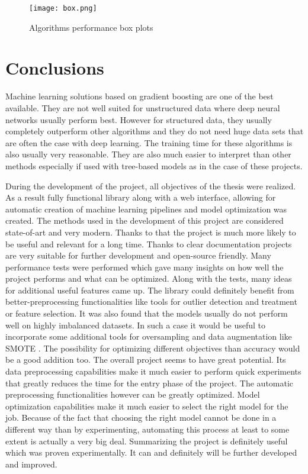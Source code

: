 \documentclass[a4paper,twoside,12pt]{book}
\begin{document}
\begin{figure}[!htb]
    \centering
    \texttt{[image: box.png]}
    \caption{Algorithms performance box plots}
    \label{fig:box}
\end{figure}

\chapter{Conclusions}
Machine learning solutions based on gradient boosting are one of the best available. They are not well suited for unstructured data where deep neural networks usually perform best. However for structured data, they usually completely outperform other algorithms and they do not need huge data sets that are often the case with deep learning. The training time for these algorithms is also usually very reasonable. They are also much easier to interpret than other methods especially if used with tree-based models as in the case of these projects.

During the development of the project, all objectives of the thesis were realized. 
As a result fully functional library along with a web interface, allowing for automatic creation of machine learning pipelines and model optimization was created.
The methods used in the development of this project are considered state-of-art and very modern. Thanks to that the project is much more likely to be useful and relevant for a long time.
Thanks to clear documentation projects are very suitable for further development and open-source friendly. Many performance tests were performed which gave many insights on how well the project performs and what can be optimized.
Along with the tests, many ideas for additional useful features came up. The library could definitely benefit from better-preprocessing functionalities like tools for outlier detection and treatment or feature selection.
It was also found that the models usually do not perform well on highly imbalanced datasets. In such a case it would be useful to incorporate some additional tools for oversampling and data augmentation like SMOTE \cite{chawla2002smote}. The possibility for optimizing different objectives than accuracy would be a good addition too.
The overall project seems to have great potential. Its data preprocessing capabilities make it much easier to perform quick experiments that greatly reduces the time for the entry phase of the project. The automatic preprocessing functionalities however can be greatly optimized. Model optimization capabilities make it much easier to select the right model for the job. Because of the fact that choosing the right model cannot be done in a different way than by experimenting, automating this process at least to some extent is actually a very big deal.
Summarizing the project is definitely useful which was proven experimentally. It can and definitely will be further developed and improved.
\end{document}
